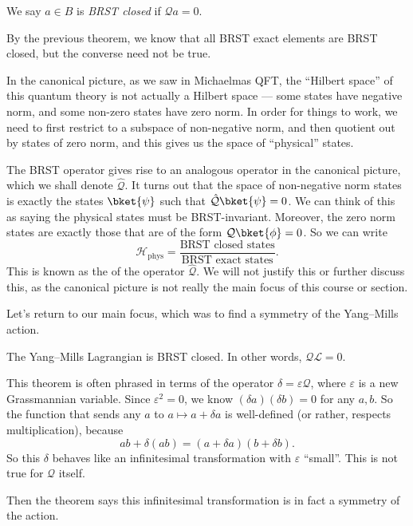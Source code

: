 \documentclass[a4paper]{article}
\begin{document}
\begin{defi}
  We say $a \in B$ is \emph{BRST closed} if $\mathcal{Q} a = 0$.
\end{defi}
By the previous theorem, we know that all BRST exact elements are BRST closed, but the converse need not be true.

In the canonical picture, as we saw in Michaelmas QFT, the ``Hilbert space'' of this quantum theory is not actually a Hilbert space --- some states have negative norm, and some non-zero states have zero norm. In order for things to work, we need to first restrict to a subspace of non-negative norm, and then quotient out by states of zero norm, and this gives us the space of ``physical'' states.

The BRST operator gives rise to an analogous operator in the canonical picture, which we shall denote $\hat{\mathcal{Q}}$. It turns out that the space of non-negative norm states is exactly the states $\bket{\psi}$ such that $\hat{\mathcal{Q}} \bket{\psi} = 0$. We can think of this as saying the physical states must be BRST-invariant. Moreover, the zero norm states are exactly those that are of the form $\mathcal{Q} \bket{\phi} = 0$. So we can write
\[
  \mathcal{H}_{\mathrm{phys}} = \frac{\text{BRST closed states}}{\text{BRST exact states}}.
\]
This is known as the  of the operator $\hat{\mathcal{Q}}$. We will not justify this or further discuss this, as the canonical picture is not really the main focus of this course or section.

Let's return to our main focus, which was to find a symmetry of the Yang--Mills action.
\begin{thm}
  The Yang--Mills Lagrangian is BRST closed. In other words, $\mathcal{Q} \mathcal{L} = 0$.
\end{thm}

This theorem is often phrased in terms of the operator $\delta = \varepsilon \mathcal{Q}$, where $\varepsilon$ is a new Grassmannian variable. Since $\varepsilon^2 = 0$, we know $(\delta a)(\delta b) = 0$ for any $a, b$. So the function that sends any $a$ to $a \mapsto a + \delta a$ is well-defined (or rather, respects multiplication), because
\[
  ab + \delta(ab) = (a + \delta a)(b + \delta b).
\]
So this $\delta$ behaves like an infinitesimal transformation with $\varepsilon$ ``small''. This is not true for $\mathcal{Q}$ itself.

Then the theorem says this infinitesimal transformation is in fact a symmetry of the action.
\end{document}
